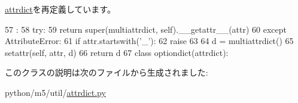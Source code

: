 \hyperlink{classm5_1_1util_1_1attrdict_1_1attrdict_a0a990b3ec3889d40889daca9ee5e4695}{attrdict}を再定義しています。


\begin{DoxyCode}
57                                :
58         try:
59             return super(multiattrdict, self).__getattr__(attr)
60         except AttributeError:
61             if attr.startswith('_'):
62                 raise
63 
64             d = multiattrdict()
65             setattr(self, attr, d)
66             return d
67 
class optiondict(attrdict):
\end{DoxyCode}


このクラスの説明は次のファイルから生成されました:\begin{DoxyCompactItemize}
\item 
python/m5/util/\hyperlink{attrdict_8py}{attrdict.py}\end{DoxyCompactItemize}
